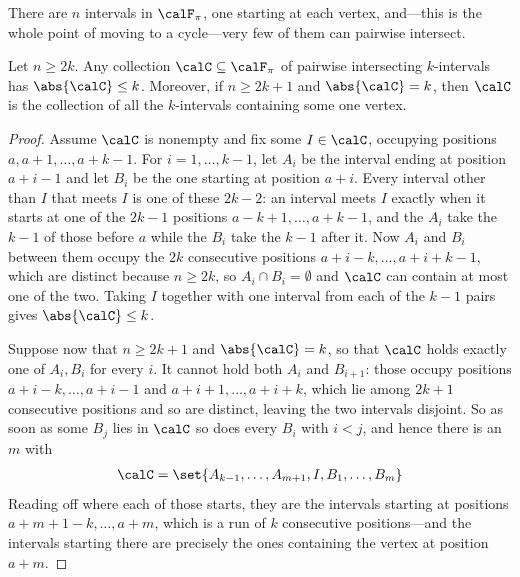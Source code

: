 There are $n$ intervals in $\calF_{\pi}$, one starting at each vertex, and---this is the whole point of moving to a cycle---very few of them can pairwise intersect.

\begin{boxlemma} \label{Ch1:Lemma:Intersecting_Intervals}
    Let $n \geq 2k$. Any collection $\calC \subseteq \calF_{\pi}$ of pairwise intersecting $k$-intervals has $\abs{\calC} \leq k$. Moreover, if $n \geq 2k + 1$ and $\abs{\calC} = k$, then $\calC$ is the collection of all the $k$-intervals containing some one vertex.
\end{boxlemma}
\begin{proof}
    Assume $\calC$ is nonempty and fix some $I \in \calC$, occupying positions $a, a + 1, \ldots, a + k - 1$. For $i = 1, \ldots, k - 1$, let $A_i$ be the interval ending at position $a + i - 1$ and let $B_i$ be the one starting at position $a + i$. Every interval other than $I$ that meets $I$ is one of these $2k - 2$: an interval meets $I$ exactly when it starts at one of the $2k - 1$ positions $a - k + 1, \ldots, a + k - 1$, and the $A_i$ take the $k - 1$ of those before $a$ while the $B_i$ take the $k - 1$ after it. Now $A_i$ and $B_i$ between them occupy the $2k$ consecutive positions $a + i - k, \ldots, a + i + k - 1$, which are distinct because $n \geq 2k$, so $A_i \cap B_i = \emptyset$ and $\calC$ can contain at most one of the two. Taking $I$ together with one interval from each of the $k - 1$ pairs gives $\abs{\calC} \leq k$.

    Suppose now that $n \geq 2k + 1$ and $\abs{\calC} = k$, so that $\calC$ holds exactly one of $A_i, B_i$ for every $i$. It cannot hold both $A_i$ and $B_{i+1}$: those occupy positions $a + i - k, \ldots, a + i - 1$ and $a + i + 1, \ldots, a + i + k$, which lie among $2k + 1$ consecutive positions and so are distinct, leaving the two intervals disjoint. So as soon as some $B_j$ lies in $\calC$ so does every $B_i$ with $i < j$, and hence there is an $m$ with
    \begin{align*}
        \calC = \set{A_{k-1}, \ldots, A_{m+1}, I, B_1, \ldots, B_m}
    \end{align*}
    Reading off where each of those starts, they are the intervals starting at positions $a + m + 1 - k, \ldots, a + m$, which is a run of $k$ consecutive positions---and the intervals starting there are precisely the ones containing the vertex at position $a + m$.
\end{proof}

